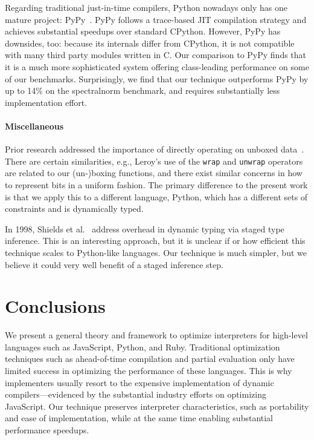 \documentclass[preprint,10pt]{popl14conf}
\begin{document}
Regarding traditional just-in-time compilers, Python nowadays only has one mature project:
PyPy~\cite{rigo.pedroni+06}.
PyPy follows a trace-based JIT compilation strategy and achieves substantial speedups over
standard CPython.
However, PyPy has downsides, too: because its internals differ from CPython, it is not compatible
with many third party modules written in C.
Our comparison to PyPy finds that it is a much more sophisticated system offering class-leading
performance on some of our benchmarks.
Surprisingly, we find that our technique outperforms PyPy by up to 14\% on the \textsf{spectralnorm}
benchmark, and requires substantially less implementation effort.



\paragraph{Miscellaneous}
Prior research addressed the importance of directly operating on unboxed
data~\cite{peytonjones.launchbury+91,leroy+92}.
There are certain similarities, e.g., Leroy's use of the \texttt{wrap} and \texttt{unwrap} operators
are related to our (un-)boxing functions, and there exist similar concerns in how to represent bits
in a uniform fashion.
The primary difference to the present work is that we apply this to a different language, Python,
which has a different sets of constraints and is dynamically typed.

In 1998, Shields et al.~\cite{shields.etal+98} address overhead in dynamic typing via staged type
inference.
This is an interesting approach, but it is unclear if or how efficient this technique scales to
Python-like languages.
Our technique is much simpler, but we believe it could very well benefit of a staged inference
step.


\section{Conclusions}\label{s:conclusions}

We present a general theory and framework to optimize interpreters for high-level languages such as
JavaScript, Python, and Ruby.
Traditional optimization techniques such as ahead-of-time compilation and partial evaluation only
have limited success in optimizing the performance of these languages.
This is why implementers usually resort to the expensive implementation of dynamic
compilers---evidenced by the substantial industry efforts on optimizing JavaScript.
Our technique preserves interpreter characteristics, such as portability and ease of implementation,
while at the same time enabling substantial performance speedups.
\end{document}
